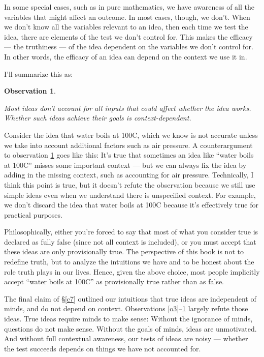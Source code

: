 \documentclass[9pt, twoside]{book}
\newtheorem{obs}{Observation}
\theoremstyle{argtstyle}
\begin{document}
In some special cases, such as in pure mathematics,
we have awareness of all the variables that might affect an outcome.
In most cases, though, we don't.
When we don't know all the variables relevant to an idea, then each time we
test the idea, there are elements of the test we don't control for.
This makes the efficacy --- the truthiness --- of the idea dependent on the
variables we don't control for. In other words, the efficacy of an idea
can depend on the context we use it in.

I'll summarize this as:
\newcommand{\obssix}{
    Most ideas don't account for all inputs that could affect
    whether the idea works.
    Whether such ideas achieve their goals is context-dependent.
}
\begin{obs}\label{o6}
    \obssix
\end{obs}

Consider the idea that water boils at
100\degree C, which we know is not accurate unless we take into account
additional factors such as air pressure.
A counterargument to observation \ref{o6} goes like this:
It's true that sometimes an idea like ``water boils at 100\degree C'' misses
some important context --- but we can always fix the idea by adding in the
missing context, such as accounting for air pressure.
Technically, I think this point is true, but
it doesn't refute the observation because we still use simple
ideas even when we understand there is unspecified context.
For example, we don't discard the idea that water boils at 100\degree C because
it's effectively true for practical purposes.

Philosophically, either you're
forced to say that
most of what you consider true is declared as fully false (since not
all context is included), or you must accept that these ideas are only
provisionally true.
The perspective of this book is not to redefine truth, but to analyze the
intuitions we have and to be honest about the role truth plays in our lives.
Hence, given the above choice, most people
implicitly accept
``water boils at 100\degree C'' as
provisionally true rather than as false.

The final claim of \S\ref{c7}
outlined our intuitions that true ideas are independent
of minds, and do not depend on context.
Observations \ref{o3}--\ref{o6} largely refute those ideas.
True ideas require minds to make sense:
Without the ignorance of minds, questions do not make sense.
Without the goals of minds, ideas are unmotivated.
And without full contextual awareness, our tests of ideas are noisy ---
whether the test succeeds depends on things we have not accounted
for.
\end{document}
